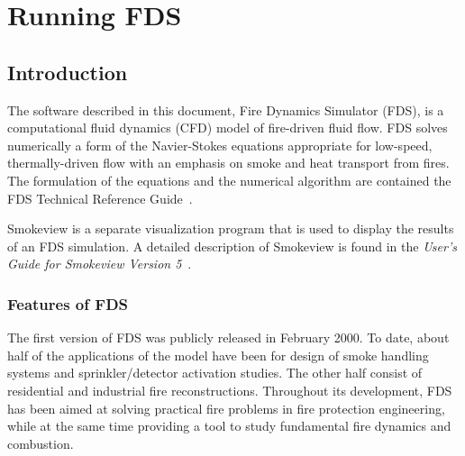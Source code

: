\documentclass[11pt]{book}
\begin{document}
\tableofcontents

\mainmatter



\part{Running FDS}


\chapter{Introduction}

The software described in this document, Fire Dynamics Simulator (FDS), is a computational
fluid dynamics (CFD) model of fire-driven fluid flow. FDS solves numerically a form of the
Navier-Stokes equations appropriate for low-speed, thermally-driven flow
with an emphasis on smoke and heat transport from fires.
The formulation of the equations and the numerical algorithm are contained the FDS Technical Reference Guide~\cite{FDS_Tech_Guide_5}.

Smokeview is a separate visualization program that is used to display the
results of an FDS simulation.
A detailed description of Smokeview is found in the
{\em User's Guide for Smokeview Version 5}~\cite{Smokeview_Users_Guide_5}.


\section{Features of FDS}

The first version of FDS was publicly released in February 2000.
To date, about half of the applications of the model have been for design of smoke
handling systems and sprinkler/detector activation studies. The other half consist of
residential and industrial fire reconstructions. Throughout its development, FDS has
been aimed at solving practical fire problems in fire protection engineering, while
at the same time providing a tool to study fundamental fire dynamics and combustion.
\end{document}
